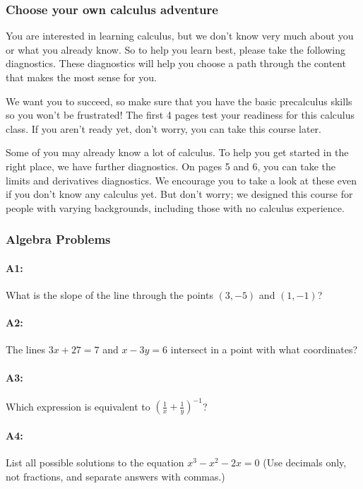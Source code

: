 \documentclass[pdftex, brazil, 12pt, twoside]{article}
\begin{document}
\subsubsection{Choose your own calculus adventure}
\label{gs-adventure-choose}

You are interested in learning calculus, but we don't know very much about you or what you already know. So to help you learn best, please take the following diagnostics. These diagnostics will help you choose a path through the content that makes the most sense for you.

We want you to succeed, so make sure that you have the basic precalculus skills so you won't be frustrated! The first 4 pages test your readiness for this calculus class. If you aren't ready yet, don't worry, you can take this course later.

Some of you may already know a lot of calculus. To help you get started in the right place, we have further diagnostics. On pages 5 and 6, you can take the limits and derivatives diagnostics. We encourage you to take a look at these even if you don't know any calculus yet. But don't worry; we designed this course for people with varying backgrounds, including those with no calculus experience.

\subsubsection{Algebra Problems}
\label{gs-adventure-algebra}

\paragraph{A1:} What is the slope of the line through the points $(3, -5)$ and $(1, -1)$?

\paragraph{A2:} The lines $3x + 27 = 7$ and $x - 3y = 6$ intersect in a point with what coordinates?

\paragraph{A3:} Which expression is equivalent to $\displaystyle \left(\frac{1}{x}+\frac{1}{y}\right)^{-1}$?

\paragraph{A4:} List all possible solutions to the equation $x^3 - x^2 - 2x = 0$ (Use decimals only, not fractions,
and separate answers with commas.)
\end{document}
